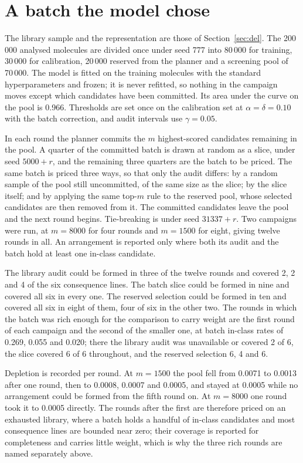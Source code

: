\documentclass[10pt]{article}
\begin{document}
\section{A batch the model chose}
\label{sec:adaptive}

The library sample and the representation are those of Section~\ref{sec:del}. The 200\,000
analysed molecules are divided once under seed 777 into 80\,000 for training, 30\,000 for
calibration, 20\,000 reserved from the planner and a screening pool of 70\,000. The model is
fitted on the training molecules with the standard hyperparameters and frozen; it is never
refitted, so nothing in the campaign moves except which candidates have been committed. Its
area under the curve on the pool is 0.966. Thresholds are set once on the calibration set at
$\alpha=\delta=0.10$ with the batch correction, and audit intervals use $\gamma=0.05$.

In each round the planner commits the $m$ highest-scored candidates remaining in the pool. A
quarter of the committed batch is drawn at random as a slice, under seed $5000+r$, and the
remaining three quarters are the batch to be priced. The same batch is priced three ways, so
that only the audit differs: by a random sample of the pool still uncommitted, of the same
size as the slice; by the slice itself; and by applying the same top-$m$ rule to the reserved
pool, whose selected candidates are then removed from it. The committed candidates leave the
pool and the next round begins. Tie-breaking is under seed $31337+r$. Two campaigns were run,
at $m=8000$ for four rounds and $m=1500$ for eight, giving twelve rounds in all. An
arrangement is reported only where both its audit and the batch hold at least one in-class
candidate.

The library audit could be formed in three of the twelve rounds and covered 2, 2 and 4 of the
six consequence lines. The batch slice could be formed in nine and covered all six in every
one. The reserved selection could be formed in ten and covered all six in eight of them, four
of six in the other two. The rounds in which the batch was rich enough for the comparison to
carry weight are the first round of each campaign and the second of the smaller one, at batch
in-class rates of 0.269, 0.055 and 0.020; there the library audit was unavailable or covered
2 of 6, the slice covered 6 of 6 throughout, and the reserved selection 6, 4 and 6.

Depletion is recorded per round. At $m=1500$ the pool fell from 0.0071 to 0.0013 after one
round, then to 0.0008, 0.0007 and 0.0005, and stayed at 0.0005 while no arrangement could be
formed from the fifth round on. At $m=8000$ one round took it to 0.0005 directly. The rounds
after the first are therefore priced on an exhausted library, where a batch holds a handful of
in-class candidates and most consequence lines are bounded near zero; their coverage is
reported for completeness and carries little weight, which is why the three rich rounds are
named separately above.
\end{document}

